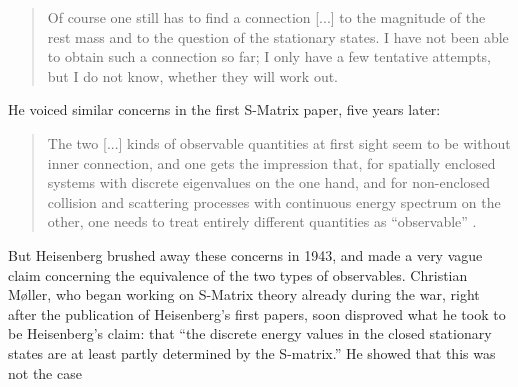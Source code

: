 \documentclass[12pt,a4paper]{article}
\begin{document}
 \begin{quote}
 Of course one still has to find a connection [...] to the magnitude of the rest mass and to the question of the stationary states. I have not been able to obtain such a connection so far; I only have a few tentative attempts, but I do not know, whether they will work out.
 \end{quote}
 
 He voiced similar concerns in the first S-Matrix paper, five years later:
 
 \begin{quote}
 The two [...] kinds of observable quantities at first sight seem to be without inner connection, and one gets the impression that, for spatially enclosed systems with discrete eigenvalues on the one hand, and for non-enclosed collision and scattering processes with continuous energy spectrum on the other, one needs to treat entirely different quantities as ``observable'' .
 \end{quote}
 
But Heisenberg brushed away these concerns in 1943, and made a very vague claim concerning the equivalence of the two types of observables. Christian M\o ller, who began working on S-Matrix theory already during the war, right after the publication of Heisenberg's first papers, soon disproved what he took to be Heisenberg's claim: that ``the discrete energy values in the closed stationary states are at least partly determined by the S-matrix.'' He showed that this was not the case \citep[p. 18]{moller_1945_general}
 
\end{document}
